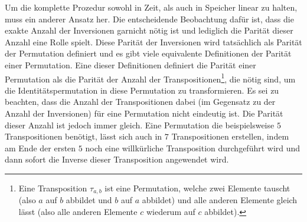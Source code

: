 \documentclass{whswinvcbook}
\begin{document}
Um die komplette Prozedur sowohl in Zeit, als auch in Speicher linear zu halten, muss ein anderer Ansatz her. Die entscheidende Beobachtung dafür ist, dass die exakte Anzahl der Inversionen garnicht nötig ist und lediglich die Parität dieser Anzahl eine Rolle spielt. Diese Parität der Inversionen wird tatsächlich als Parität der Permutation definiert und es gibt viele equivalente Definitionen der Parität einer Permutation. Eine dieser Definitionen definiert die Parität einer Permutation als die Parität der Anzahl der Transpositionen\footnote{Eine Transposition $\tau_{a,b}$ ist eine Permutation, welche zwei Elemente tauscht (also $a$ auf $b$ abbildet und $b$ auf $a$ abbildet) und alle anderen Elemente gleich lässt (also alle anderen Elemente $c$ wiederum auf $c$ abbildet).}, die nötig sind, um die Identitätspermutation in diese Permutation zu transformieren. Es sei zu beachten, dass die Anzahl der Transpositionen dabei (im Gegensatz zu der Anzahl der Inversionen) für eine Permutation nicht eindeutig ist. Die Parität dieser Anzahl ist jedoch immer gleich. Eine Permutation die beispielsweise $5$ Transpositionen benötigt, lässt sich auch in $7$ Transpositionen erstellen, indem am Ende der ersten $5$ noch eine willkürliche Transposition durchgeführt wird und dann sofort die Inverse dieser Transposition angewendet wird.
\end{document}
